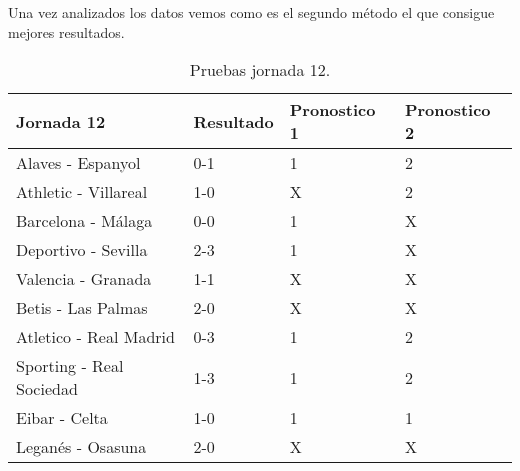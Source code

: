 Una vez analizados los datos vemos como es el segundo método el que consigue mejores resultados.
 \begin{table}
  \begin{center}
   \begin{tabular}{|p{5cm} | p{2.5cm} |p{2.5cm} |p{2.5cm} |}
    \hline
   	Jornada 12 & Resultado & Pronostico 1 & Pronostico 2\\
    \hline
    Alaves - Espanyol & 0-1 & \cellcolor{red}1 & \cellcolor{green}2\\
    \hline
    Athletic - Villareal & 1-0 & \cellcolor{red}X & \cellcolor{red}2\\
    \hline
    Barcelona - Málaga & 0-0 & \cellcolor{red}1 & \cellcolor{green}X\\
    \hline
    Deportivo - Sevilla & 2-3 & \cellcolor{red}1 & \cellcolor{red}X\\
    \hline
    Valencia - Granada & 1-1 & \cellcolor{green}X & \cellcolor{green}X\\
    \hline
    Betis - Las Palmas & 2-0 & \cellcolor{red}X & \cellcolor{red}X\\
    \hline
    Atletico - Real Madrid & 0-3 & \cellcolor{red}1 & \cellcolor{green}2\\
    \hline
    Sporting - Real Sociedad & 1-3 & \cellcolor{red}1 & \cellcolor{green}2\\
    \hline
	Eibar - Celta & 1-0 & \cellcolor{green}1 & \cellcolor{green}1\\
    \hline
    Leganés - Osasuna & 2-0 & \cellcolor{red}X & \cellcolor{red}X\\
    \hline
   \end{tabular}
   \caption{Pruebas jornada 12.}
   \label{tabla:jornada12}
  \end{center}
 \end{table} 


